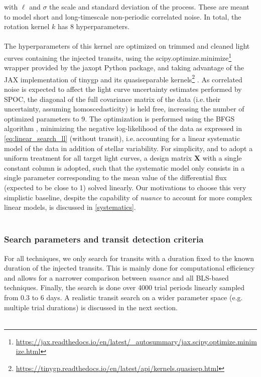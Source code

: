 \documentclass[modern]{aastex631}
\newcommand{\nuancemethod}{\textit{nuance}}
\newcommand{\footlink}[1]{\footnote{\url{#1}}}
\begin{document}
with $\ell$ and $\sigma$ the scale and standard deviation of the process. These are meant to model short and long-timescale non-periodic correlated noise. In total, the rotation kernel $k$ has 8 hyperparameters.\\\\
The hyperparameters of this kernel are optimized on trimmed and cleaned light curves containing the injected transits, using the \textsf{scipy.optimize.minimize}\footlink{https://jax.readthedocs.io/en/latest/_autosummary/jax.scipy.optimize.minimize.html} wrapper provided by the \textsf{jaxopt} Python package, and taking advantage of the \textsf{JAX} implementation of \textsf{tinygp} and its quasiseparable kernels\footlink{https://tinygp.readthedocs.io/en/latest/api/kernels.quasisep.html} \citep{celerite}. As correlated noise is expected to affect the light curve uncertainty estimates performed by SPOC, the diagonal of the full covariance matrix of the data (i.e.\,their uncertainty, assuming homoscedasticity) is held free, increasing the number of optimized parameters to 9. The optimization is performed using the \textsf{BFGS} algorithm \citep{Fletcher1987}, minimizing the negative log-likelihood of the data as expressed in \autoref{eq:linear_search_ll} (without transit), i.e.\,accounting for a linear systematic model of the data in addition of stellar variability. For simplicity, and to adopt a uniform treatment for all target light curves, a design matrix $\bm{X}$ with a single constant column is adopted, such that the systematic model only consists in a single parameter corresponding to the mean value of the differential flux (expected to be close to 1) solved linearly. Our motivations to choose this very simplistic baseline, despite the capability of \nuancemethod{} to account for more complex linear models, is discussed in \autoref{systematics}.\\\\
\subsubsection*{Search parameters and transit detection criteria}
For all techniques, we only search for transits with a duration fixed to the known duration of the injected transits. This is mainly done for computational efficiency and allows for a narrower comparison between \nuancemethod{} and all BLS-based techniques. Finally, the search is done over 4000 trial periods linearly sampled from 0.3 to 6 days. A realistic transit search on a wider parameter space (e.g. multiple trial durations) is discussed in the next section.\\\\
\end{document}
